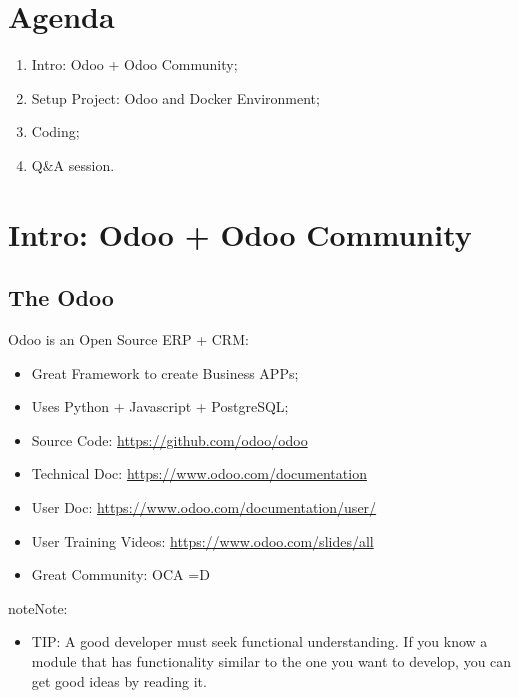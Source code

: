 \documentclass[letterpaper,10pt,english]{sphinxmanual}
\begin{document}
\chapter{Agenda}
\label{index:agenda}\begin{enumerate}
\item {} 
Intro: Odoo + Odoo Community;

\item {} 
Setup Project: Odoo and Docker Environment;

\item {} 
Coding;

\item {} 
Q\&A session.

\end{enumerate}


\chapter{Intro: Odoo + Odoo Community}
\label{index:intro-odoo-odoo-community}

\section{The Odoo}
\label{index:the-odoo}
Odoo is an Open Source ERP + CRM:
\begin{itemize}
\item {} 
Great Framework to create Business APPs;

\item {} 
Uses Python + Javascript + PostgreSQL;

\item {} 
Source Code: \url{https://github.com/odoo/odoo}

\item {} 
Technical Doc: \url{https://www.odoo.com/documentation}

\item {} 
User Doc: \url{https://www.odoo.com/documentation/user/}

\item {} 
User Training Videos: \url{https://www.odoo.com/slides/all}

\item {} 
Great Community: OCA =D

\end{itemize}

\begin{notice}{note}{Note:}\begin{itemize}
\item {} 
TIP: A good developer must seek functional understanding. If you know a module that has functionality similar to the one you want to develop, you can get good ideas by reading it.

\end{itemize}
\end{notice}
\end{document}
